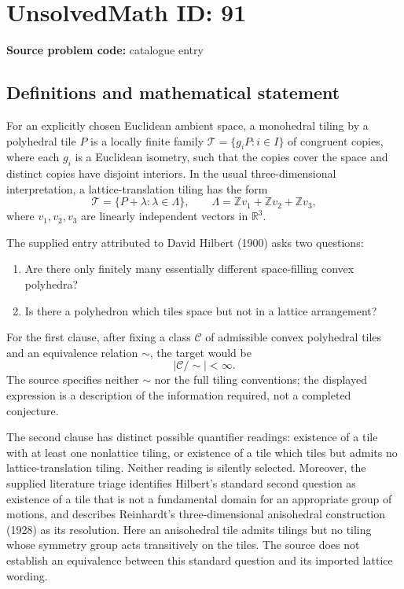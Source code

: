 \documentclass[11pt]{article}
\newcommand{\Z}{\mathbb{Z}}
\newcommand{\R}{\mathbb{R}}
\begin{document}
\section*{UnsolvedMath ID: 91}
\textbf{Source problem code:} catalogue entry
\subsection{Definitions and mathematical statement}
For an explicitly chosen Euclidean ambient space, a monohedral tiling by a polyhedral tile \(P\) is a locally finite family \(\mathcal T=\{g_iP:i\in I\}\) of congruent copies, where each \(g_i\) is a Euclidean isometry, such that the copies cover the space and distinct copies have disjoint interiors. In the usual three-dimensional interpretation, a lattice-translation tiling has the form
\[
\mathcal T=\{P+\lambda:\lambda\in\Lambda\},\qquad
\Lambda=\Z v_1+\Z v_2+\Z v_3,
\]
where \(v_1,v_2,v_3\) are linearly independent vectors in \(\R^3\).

The supplied entry attributed to David Hilbert (1900) asks two questions:
\begin{enumerate}
\item Are there only finitely many essentially different space-filling convex polyhedra?
\item Is there a polyhedron which tiles space but not in a lattice arrangement?
\end{enumerate}
For the first clause, after fixing a class \(\mathcal C\) of admissible convex polyhedral tiles and an equivalence relation \(\sim\), the target would be
\[
|\mathcal C/\!\sim|<\infty.
\]
The source specifies neither \(\sim\) nor the full tiling conventions; the displayed expression is a description of the information required, not a completed conjecture.

The second clause has distinct possible quantifier readings: existence of a tile with at least one nonlattice tiling, or existence of a tile which tiles but admits no lattice-translation tiling. Neither reading is silently selected. Moreover, the supplied literature triage identifies Hilbert's standard second question as existence of a tile that is not a fundamental domain for an appropriate group of motions, and describes Reinhardt's three-dimensional anisohedral construction (1928) as its resolution. Here an anisohedral tile admits tilings but no tiling whose symmetry group acts transitively on the tiles. The source does not establish an equivalence between this standard question and its imported lattice wording.
\end{document}
